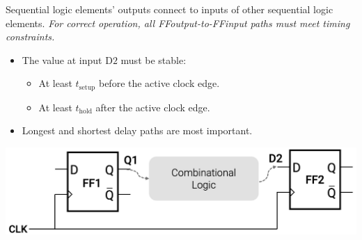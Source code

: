 \documentclass[12pt,openany]{book}
\begin{document}
 Sequential logic elements' outputs connect to inputs of other sequential logic elements. \newline \textit{For correct operation, all FFoutput-to-FFinput paths must meet timing constraints.}
 \begin{center}
	\hspace{-0.07\textwidth}
	\begin{minipage}{0.6\textwidth}
		\begin{itemize}
		    \item[] The value at input \( \text{D2} \) must be stable:
		    \begin{itemize}
		        \item At least \( t_{\text{setup}} \) before the active clock edge.
		        \item At least \( t_{\text{hold}} \) after the active clock edge.
		    \end{itemize}
		    \item[] Longest and shortest delay paths are most important.
		\end{itemize}
	\end{minipage}
\hfill	
\hspace{-0.05\textwidth}
\begin{minipage}{0.4\textwidth}
		\includegraphics[width=1.3\textwidth]{circuits/15.1.2.png}
	\end{minipage}
\end{center}
\end{document}
